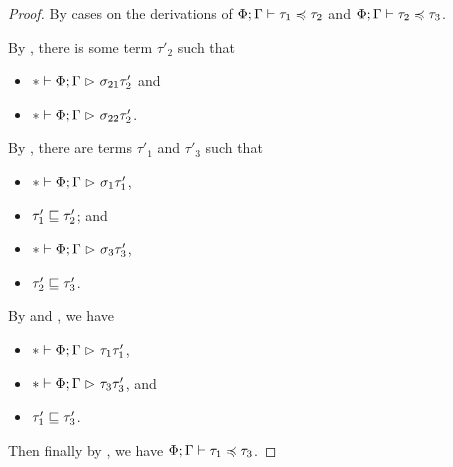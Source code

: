 \begin{proof}
By cases on the derivations of $\Phi; \Gamma \mathrel{\vdash} \tau_1 \mathrel{\preccurlyeq} \tau_2$
and $\Phi; \Gamma \mathrel{\vdash} \tau_2 \mathrel{\preccurlyeq} \tau_3$.
By , there is some term $\tau'_2$ such that
\begin{itemize}[noitemsep]
  \item $* \mathrel{\vdash} \Phi; \Gamma \mathrel{\rhd}_{} \sigma_{21}{\tau'_2}$ and
  \item $* \mathrel{\vdash} \Phi; \Gamma \mathrel{\rhd}_{} \sigma_{22}{\tau'_2}$.
\end{itemize}
By , there are terms $\tau'_1$ and $\tau'_3$ such that
\begin{itemize}[noitemsep]
  \item $* \mathrel{\vdash} \Phi; \Gamma \mathrel{\rhd}_{} \sigma_1{\tau'_1}$,
  \item $\tau'_1 \mathrel{\sqsubseteq} \tau'_2$; and
  \item $* \mathrel{\vdash} \Phi; \Gamma \mathrel{\rhd}_{} \sigma_3{\tau'_3}$,
  \item $\tau'_2 \mathrel{\sqsubseteq} \tau'_3$.
\end{itemize}
By  and , we have
\begin{itemize}[noitemsep]
  \item $* \mathrel{\vdash} \Phi; \Gamma \mathrel{\rhd}_{} \tau_1{\tau'_1}$,
  \item $* \mathrel{\vdash} \Phi; \Gamma \mathrel{\rhd}_{} \tau_3{\tau'_3}$, and
  \item $\tau'_1 \mathrel{\sqsubseteq} \tau'_3$.
\end{itemize}
Then finally by , we have $\Phi; \Gamma \mathrel{\vdash} \tau_1 \mathrel{\preccurlyeq} \tau_3$.
\end{proof}

